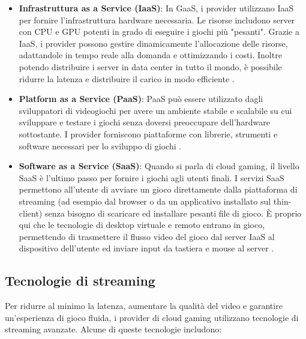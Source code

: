 \documentclass[12pt,a4paper,openright,twoside]{book}
\begin{document}
\begin{itemize}
    \item \textbf{Infrastruttura as a Service (IaaS)}: In GaaS, i provider utilizzano \ac{IaaS} per fornire l'infrastruttura hardware necessaria. Le risorse includono server con CPU e GPU potenti in grado di eseguire i giochi più "pesanti". Grazie a IaaS, i provider possono gestire dinamicamente l'allocazione delle risorse, adattandole in tempo reale alla domanda e ottimizzando i costi. Inoltre potendo distribuire i server in data center in tutto il mondo, è possibile ridurre la latenza e distribuire il carico in modo efficiente \cite{HARLE2023}.
    \item \textbf{Platform as a Service (PaaS)}: PaaS può essere utilizzato dagli sviluppatori di videogiochi per avere un ambiente stabile e scalabile su cui sviluppare e testare i giochi senza doversi preoccupare dell'hardware sottostante. I provider forniscono piattaforme con librerie, strumenti e software necessari per lo sviluppo di giochi \cite{HARLE2023}.
    \item \textbf{Software as a Service (SaaS)}: Quando si parla di cloud gaming, il livello SaaS è l'ultimo passo per fornire i giochi agli utenti finali. I servizi SaaS permettono all'utente di avviare un gioco direttamente dalla piattaforma di streaming (ad esempio dal browser o da un applicativo installato sul thin-client) senza bisogno di scaricare ed installare pesanti file di gioco. È proprio qui che le tecnologie di desktop virtuale e remoto entrano in gioco, permettendo di trasmettere il flusso video del gioco dal server IaaS al dispositivo dell'utente ed inviare input da tastiera e mouse al server \cite{HARLE2023}.
\end{itemize}

\subsection{Tecnologie di streaming}
\label{subsec:streaming-tech}
Per ridurre al minimo la latenza, aumentare la qualità del video e garantire un'esperienza di gioco fluida, i provider di cloud gaming utilizzano tecnologie di streaming avanzate.
Alcune di queste tecnologie includono:
\end{document}
